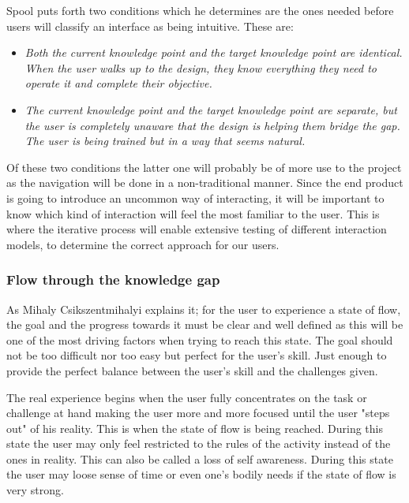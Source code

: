 Spool puts forth two conditions which he determines are the ones needed 
before users will classify an interface as being intuitive. These are:
\begin{itemize}
\item \textit{Both the current knowledge point and the target knowledge point are 
identical. When the user walks up to the design, they know everything they need 
to operate it and complete their objective.}\cite{JaredMSpool}
\item \textit{The current knowledge point and the target knowledge point are 
separate, but the user is completely unaware that the design is helping them bridge 
the gap. The user is being trained but in a way that seems natural.}\cite{JaredMSpool}
\end{itemize}\label{intuitiveConditions} 
Of these two conditions the latter one will probably be of more use to the 
project as the navigation will be done in a non-traditional manner. Since the end product is going to 
introduce an uncommon way of interacting, it will be important to know which kind 
of interaction will feel the most familiar to the user. This is where the iterative 
process will enable extensive testing of different interaction models, to 
determine the correct approach for our users.
\subsubsection{Flow through the knowledge gap}
\label{FlowTheory}

As Mihaly Csikszentmihalyi \cite{Flow} explains it; for the user to experience a state of flow, the goal and the progress towards it must be clear and well defined as this will be one of the most driving factors when trying to reach this state. The goal should not be too difficult nor too easy but perfect for the user's skill. Just enough to provide the perfect balance between the user's skill and the challenges given.\cite{Flow}
	
The real experience begins when the user fully concentrates on the task or challenge at hand making the user more and more focused until the user "steps out" of his reality. This is when the state of flow is being reached. \cite{Flow} During this state the user may only feel restricted to the rules of the activity instead of the ones in reality. This can also be called a loss of self awareness. During this state the user may loose sense of time or even one's bodily needs if the state of flow is very strong.\cite{Flow}
	
